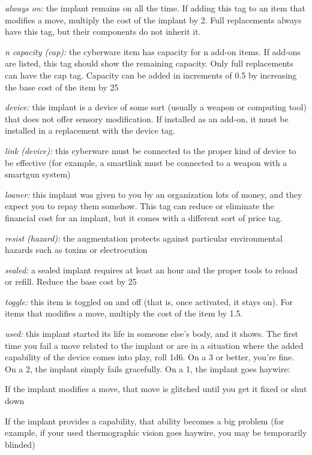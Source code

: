 \documentclass[oneside,10pt]{article}
\begin{document}
\begin{multicols}{2}
\begin{dent}
\textit{always on:} the implant remains on all the time. If adding
this tag to an item that modifies a move, multiply the cost
of the implant by 2. Full replacements always have this tag,
but their components do not inherit it.

\textit{n capacity (cap):} the cyberware item has capacity for n
add-on items. If add-ons are listed, this tag should show
the remaining capacity. Only full replacements can have
the cap tag. Capacity can be added in increments of 0.5 by
increasing the base cost of the item by 25%

\textit{device:} this implant is a device of some sort (usually a
weapon or computing tool) that does not offer sensory
modification. If installed as an add-on, it must be installed
in a replacement with the device tag.

\textit{link (device):} this cyberware must be connected to the
proper kind of device to be effective (for example, a smartlink must be connected to a weapon with a smartgun system)

\textit{loaner:} this implant was given to you by an organization
lots of money, and they expect you to repay them somehow. This tag can reduce or eliminate the financial cost for
an implant, but it comes with a different sort of price tag.

\textit{resist (hazard):} the augmentation protects against particular environmental hazards such as toxins or electrocution

\textit{sealed:} a sealed implant requires at least an hour and the
proper tools to reload or refill. Reduce the base cost by
25%

\textit{toggle:} this item is toggled on and off (that is, once activated, it stays on). For items that modifies a move, multiply
the cost of the item by 1.5.

\textit{used:} this implant started its life in someone else’s body,
and it shows. The first time you fail a move related to the
implant or are in a situation where the added capability
of the device comes into play, roll 1d6. On a 3 or better,
you’re fine. On a 2, the implant simply fails gracefully. On
a 1, the implant goes haywire:
\begin{dent}

\tcirc{} If the implant modifies a move, that move is glitched
until you get it fixed or shut down

\tcirc{} If the implant provides a capability, that ability becomes
a big problem (for example, if your used thermographic
vision goes haywire, you may be temporarily blinded)


\end{dent}
\end{dent}
\end{multicols}
\end{document}
